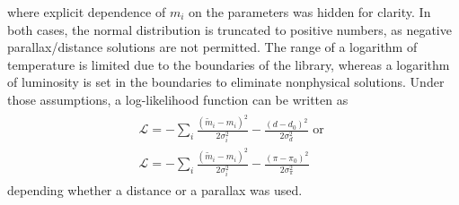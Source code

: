\documentclass{pracalicmgr}
\begin{document}
where explicit dependence of $m_i$ on the parameters was hidden for clarity. In both cases, the normal distribution is truncated to positive numbers, as
negative parallax/distance solutions are not permitted. The range of a logarithm of temperature is limited due to the boundaries of the library, whereas a logarithm of luminosity is
set in the boundaries to eliminate nonphysical solutions.
Under those assumptions, a log-likelihood function can be written as 
\begin{align}
    \begin{split}
    \mathcal{L}=-\sum_i\frac{(\tilde{m}_i-m_i)^2}{2\sigma_i^2}-\frac{(d-d_0)^2}{2\sigma_d^2} \textrm{ or }\\
    \mathcal{L}=-\sum_i\frac{(\tilde{m}_i-m_i)^2}{2\sigma_i^2}-\frac{(\pi-\pi_0)^2}{2\sigma_{\pi}^2}
    \end{split}
\end{align} depending whether a distance or a parallax was used. 
\end{document}
